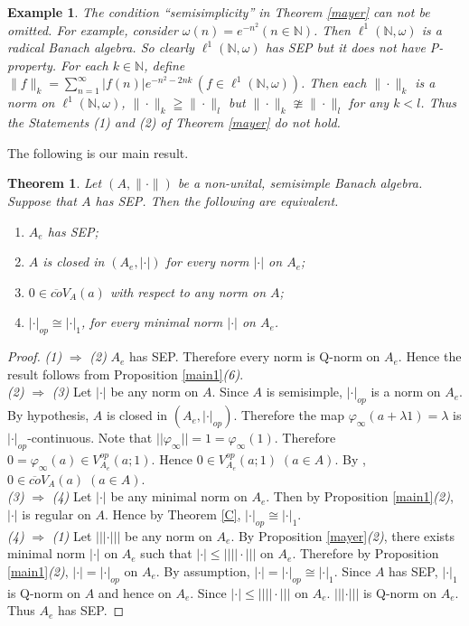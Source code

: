 \documentclass{amsart}
\theoremstyle{plain}
\newtheorem{thm}[defn]{Theorem}
\newtheorem{exam}[defn]{Example}
\numberwithin{equation}{section}
\begin{document}
\begin{exam}
The condition ``semisimplicity'' in Theorem \ref{mayer} can not be omitted. For example, consider $\omega(n)=e^{-n^2}(n \in \mathbb N)$. Then $\ell^1(\mathbb N, \omega)$ is a radical Banach algebra. So clearly $\ell^1(\mathbb N, \omega)$ has SEP but it does not have P-property. For each $k \in \mathbb N$, define $\|f\|_k = \sum_{n=1}^{\infty}|f(n)| e^{-n^2-2nk} \, (f \in \ell^1(\mathbb N, \omega))$. Then each $\|\cdot\|_k$ is a norm on $\ell^1(\mathbb N, \omega)$, $\|\cdot\|_k \geqq \|\cdot\|_l$ but $\|\cdot\|_k \ncong \|\cdot\|_l$ for any $k < l$. Thus the Statements (1) and (2) of Theorem \ref{mayer} do not hold.
\end{exam}

The following is our main result.

\begin{thm}
Let $(A, \|\cdot\|)$ be a non-unital, semisimple Banach algebra. Suppose that $A$ has SEP. Then the following are equivalent.
\begin{enumerate}
\item $A_e$ has SEP;
\item $A$ is closed in $(A_e, |\cdot|)$ for every norm $|\cdot|$ on $A_e$;
\item $0 \in \overline{co}V_A(a)$ with respect to any norm on $A$;
\item $|\cdot|_{op} \cong |\cdot|_1$, for every minimal norm $|\cdot|$ on $A_e$.
\end{enumerate}
\end{thm}

\begin{proof}
\emph{(1)} $\Rightarrow$ \emph{(2)} $A_e$ has SEP. Therefore every norm is Q-norm on $A_e$. Hence the result follows from Proposition \ref{main1}\emph{(6)}.\\
\emph{(2)} $\Rightarrow$ \emph{(3)} Let $|\cdot|$ be any norm on $A$. Since $A$ is semisimple, $|\cdot|_{op}$ is a norm on $A_e$. By hypothesis, $A$ is closed in $(A_e, |\cdot|_{op})$. Therefore the map $\varphi_{\infty}(a+\lambda1) = \lambda$ is $|\cdot|_{op}$-continuous. Note that $||\varphi_{\infty}|| = 1 = \varphi_{\infty}(1)$. Therefore $0 = \varphi_{\infty}(a) \in V_{A_e}^{op}(a;1)$. Hence $0 \in V_{A_e}^{op}(a;1) \; (a \in A)$. By \cite[Theorem 2.4(1)]{DePa:21}, $0 \in \overline{co}V_A(a) \; (a \in A)$.\\
\emph{(3)} $\Rightarrow$ \emph{(4)} Let $|\cdot|$ be any minimal norm on $A_e$. Then by Proposition \ref{main1}\emph{(2)}, $|\cdot|$ is regular on $A$. Hence by Theorem \ref{C}, $|\cdot|_{op} \cong |\cdot|_1$.\\
\emph{(4)} $\Rightarrow$ \emph{(1)} Let $|||\cdot|||$ be any norm on $A_e$. By Proposition \ref{mayer}\emph{(2)}, there exists minimal norm $|\cdot|$ on $A_e$ such that $|\cdot| \leq ||||\cdot|||$ on $A_e$. Therefore by Proposition \ref{main1}\emph{(2)}, $|\cdot| =|\cdot|_{op}$ on $A_e$. By assumption, $|\cdot| = |\cdot|_{op} \cong |\cdot|_1$. Since $A$ has SEP, $|\cdot|_1$ is Q-norm on $A$ and hence on $A_e$. Since $|\cdot| \leq ||||\cdot|||$ on $A_e$. $|||\cdot|||$ is Q-norm on $A_e$. Thus $A_e$ has SEP.
\end{proof}
\end{document}
